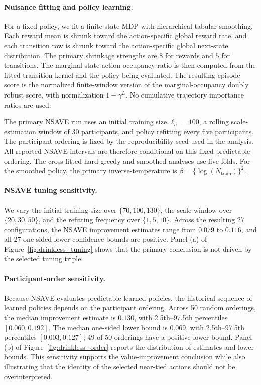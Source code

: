 \documentclass[12pt]{article}
\theoremstyle{remark}\newtheorem{remark}[theorem]{Remark}\theoremstyle{plain}
\begin{document}
\paragraph{Nuisance fitting and policy learning.}
For a fixed policy, we fit a finite-state MDP with hierarchical tabular smoothing.
Each reward mean is shrunk toward the action-specific global reward rate, and each transition row is shrunk toward the action-specific global next-state distribution.
The primary shrinkage strengths are $8$ for rewards and $5$ for transitions.
The marginal state-action occupancy ratio is then computed from the fitted transition kernel and the policy being evaluated.
The resulting episode score is the normalized finite-window version of the marginal-occupancy doubly robust score, with normalization $1-\gamma^L$.
No cumulative trajectory importance ratios are used.

The primary NSAVE run uses an initial training size $\ell_n=100$, a rolling scale-estimation window of 30 participants, and policy refitting every five participants.
The participant ordering is fixed by the reproducibility seed used in the analysis.
All reported NSAVE intervals are therefore conditional on this fixed predictable ordering.
The cross-fitted hard-greedy and smoothed analyses use five folds.
For the smoothed policy, the primary inverse-temperature is $\beta=\{\log(N_{\mathrm{train}})\}^2$.

\paragraph{NSAVE tuning sensitivity.}
We vary the initial training size over $\{70,100,130\}$, the scale window over $\{20,30,50\}$, and the refitting frequency over $\{1,5,10\}$.
Across the resulting 27 configurations, the NSAVE improvement estimates range from $0.079$ to $0.116$, and all 27 one-sided lower confidence bounds are positive.
Panel (a) of Figure~\ref{fig:drinkless_tuning} shows that the primary conclusion is not driven by the selected tuning triple.

\paragraph{Participant-order sensitivity.}
Because NSAVE evaluates predictable learned policies, the historical sequence of learned policies depends on the participant ordering.
Across 50 random orderings, the median improvement estimate is $0.130$, with 2.5th--97.5th percentiles $[0.060,0.192]$.
The median one-sided lower bound is $0.069$, with 2.5th--97.5th percentiles $[0.003,0.127]$; 49 of 50 orderings have a positive lower bound.
Panel (b) of Figure~\ref{fig:drinkless_order} reports the distribution of estimates and lower bounds.
This sensitivity supports the value-improvement conclusion while also illustrating that the identity of the selected near-tied actions should not be overinterpreted.
\end{document}
